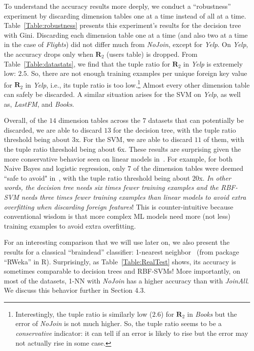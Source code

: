 \documentclass{vldb}
\begin{document}
To understand the accuracy results more deeply, we conduct a ``robustness'' experiment by discarding dimension tables one at a time instead of all at a time.
Table~\ref{Table:robustness} presents this experiment's results for the decision tree with Gini.
Discarding each dimension table one at a time (and also two at a time in the case of \textit{Flights}) did not differ much from \textit{NoJoin}, except for \textit{Yelp}.
On \textit{Yelp}, the accuracy drops only when $\textbf{R}_2$ (users table) is dropped. From Table~\ref{Table:datastats}, we find that the tuple ratio for $\textbf{R}_2$ in 
\textit{Yelp} is extremely low: $2.5$. So, there are not enough training examples per unique foreign key value for $\textbf{R}_2$ in \textit{Yelp}, i.e., its tuple ratio is too 
low.\footnote{Interestingly, the tuple ratio is similarly low ($2.6$) for $\textbf{R}_2$ in \textit{Books} but the error of \textit{NoJoin} is not much higher. So, the tuple 
ratio seems to be a \textit{conservative} indicator: it can tell if an error is likely to rise but the error may not actually rise in some case.}
Almost every other dimension table can safely be discarded. A similar situation arises for the SVM on \textit{Yelp}, as well as, \textit{LastFM}, and \textit{Books}. 

Overall, of the $14$ dimension tables across the $7$ datasets that can potentially be discarded, we are able to discard $13$ for the decision tree, with 
the tuple ratio threshold being about $3$x. For the SVM, we are able to discard $11$ of them, with the tuple ratio threshold being about $6$x.
These results are surprising given the more conservative behavior seen on linear models in~\cite{hamlet}. For example, for both Naive Bayes and logistic regression, only 
$7$ of the dimension tables were deemed ``safe to avoid" in~\cite{hamlet}, with the tuple ratio threshold being about $20$x. \textit{In other words, the decision tree
needs six times fewer training examples and the RBF-SVM needs three times fewer training examples than linear models to avoid extra overfitting when discarding foreign features}! 
This is counter-intuitive because conventional wisdom is that more complex ML models need more (not less) training examples to avoid extra overfitting.

For an interesting comparison that we will use later on, we also present the results for a classical ``braindead'' classifier: 1-nearest neighbor~\cite{mitchellbook} (from
package ``RWeka'' in R).
Surprisingly, as Table~\ref{Table:RealTest} shows,  its accuracy is sometimes comparable to decision trees and RBF-SVMs! 
More importantly, on most of the datasets, 1-NN with \textit{NoJoin} has a higher accuracy than with \textit{JoinAll}. We discuss this behavior further in Section 4.3.
\end{document}
